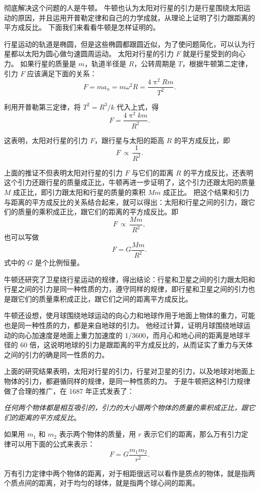 彻底解决这个问题的人是牛顿。
牛顿也认为太阳对行星的引力是行星围绕太阳运动的原因，并且运用开普勒定律和自己的力学成就，从理论上证明了引力跟距离的平方成反比。
下面我们来看看牛顿是怎样证明的。

行星运动的轨道是椭圆，但是这些椭圆都跟圆近似，为了使问题简化，可以认为行星都以太阳为圆心做匀速圆周运动。
太阳对行星的引力 $F$ 就是行星受到的向心力。
如果行星的质量是 $m$，轨道半径是 $R$，公转周期是 $T$，根据牛顿第二定律，引力 $F$ 应该满足下面的关系：
\[F=ma_n=m\omega^2 R=\frac{4\uppi^2 Rm}{T^2}.\]

利用开普勒第三定律，将 $T^2=R^3/k$ 代入上式，得
\[F=\frac{4\uppi^2km}{R^2}.\]

这表明，太阳对行星的引力 $F$，跟行星与太阳的距高 $R$ 的平方成反比，即
\[F\,\propto\,\frac{1}{R^2}.\]

上面的推证不但表明太阳对行星的引力 $F$ 与它们的距离 $R$ 的平方成反比，还表明这个引力还跟行星的质量成正比，牛顿再进一步证明了，这个引力还跟太阳的质量 $M$ 成正比，即引力跟太阳和行星的质量的乘积 $Mm$ 成正比。
把这个结果和引力与距离的平方成反比的关系结合起来，就可以得出：太阳和行星之间的引力，跟它们的质量的乘积成正比，跟它们的距离的平方成反比。即
\[F\,\propto\,\frac{Mm}{R^2},\]
也可以写做
\[F=G\frac{Mm}{R^2}.\]
式中的 $G$ 是个比例恒量。

牛顿还研究了卫星绕行星运动的规律，得出结论：行星和卫星之间的引力跟太阳和行星之间的引力是同一种性质的力，遵守同样的规律，即行星和卫星之间的引力也是跟它们的质量乘积成正比，跟它们之间的距离平方成反比。

牛顿还设想，使月球围绕地球运动的向心力和地球作用于地面上物体的重力，可能也是同一种性质的力，都是来自地球的引力。
他经过计算，证明月球围绕地球运动的向心加速度是地面上重力加速度的 1/3600，而月心和地心间的距离是地球半径的 60 倍，这说明地球的引力是跟距离的平方成反比的，从而证实了重力与天体之间的引力的确是同一性质的力。

上面的研究结果表明，太阳对行星的引力，行星对卫星的引力，以及地球对地面上物体的引力，都避循同样的规律，是同一种性质的力。
于是牛顿把这种引力规律做了合理的推广，在 1687 年正式发表了：

\emph{任何两个物体都是相互吸引的，引力的大小跟两个物体的质量的乘积成正比，跟它们的距离的平方成反比}。

如果用 $m_1$ 和 $m_2$ 表示两个物体的质量，用 $r$ 表示它们的距离，那么万有引力定律可以用下面的公式来表示：
\[ F=G\frac{m_1m_2}{r^2}.\]

万有引力定律中两个物体的距离，对于相距很远可以看作是质点的物体，就是指两个质点间的距离，对于均匀的球体，就是指两个球心间的距离。

